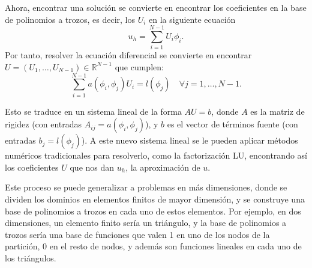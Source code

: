 \documentclass[a4paper,11pt,spanish, twoside, leqno]{tfg-uam}
\theoremstyle{definition}
\begin{document}
Ahora, encontrar una solución se convierte en encontrar los coeficientes en la base de polinomios a trozos, es decir, los $U_i$ en la siguiente ecuación
\begin{equation}
    u_h = \sum_{i=1}^{N-1} U_i\phi_i.
\end{equation}
Por tanto, resolver la ecuación diferencial se convierte en encontrar $U=(U_1,\dots, U_{N-1}) \in \mathbb{R}^{N-1}$ que cumplen:
\begin{equation}
    \sum_{i=1}^{N-1} a\left( \phi_i,\phi_j\right)U_i = l(\phi_j) \quad \forall j = 1,\dots,N-1.
\end{equation}

Esto se traduce en un sistema lineal de la forma $AU = b$, donde $A$ es la matriz de rigidez (con entradas $A_{ij}=a\left( \phi_i,\phi_j\right)$), y $b$ es el vector de términos fuente (con entradas $b_j = l(\phi_j)$). A este nuevo sistema lineal se le pueden aplicar métodos numéricos tradicionales para resolverlo, como la factorización LU, encontrando así los coeficientes $U$ que nos dan $u_h$, la aproximación de $u$.

Este proceso se puede generalizar a problemas en más dimensiones, donde se dividen los dominios en elementos finitos de mayor dimensión, y se construye una base de polinomios a trozos en cada uno de estos elementos. Por ejemplo, en dos dimensiones, un elemento finito sería un triángulo, y la base de polinomios a trozos sería una base de funciones que valen 1 en uno de los nodos de la partición, 0 en el resto de nodos, y además son funciones lineales en cada uno de los triángulos.
\end{document}
